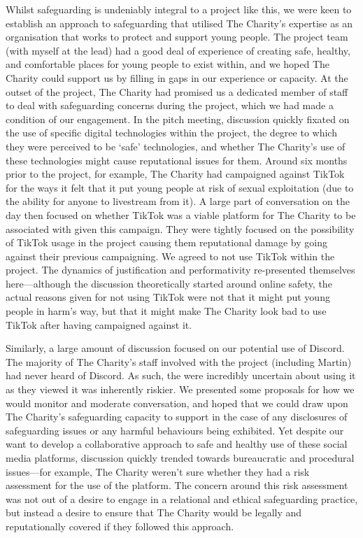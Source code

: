 Whilst safeguarding is undeniably integral to a project like this, we were keen to establish an approach to safeguarding that utilised The Charity's expertise as an organisation that works to protect and support young people. The project team (with myself at the lead) had a good deal of experience of creating safe, healthy, and comfortable places for young people to exist within, and we hoped The Charity could support us by filling in gaps in our experience or capacity.  At the outset of the project, The Charity had promised us a dedicated member of staff to deal with safeguarding concerns during the project, which we had made a condition of our engagement. In the pitch meeting, discussion quickly fixated on the use of specific digital technologies within the project, the degree to which they were perceived to be ‘safe’ technologies, and whether The Charity's use of these technologies might cause reputational issues for them. Around six months prior to the project, for example, The Charity had campaigned against TikTok for the ways it felt that it put young people at risk of sexual exploitation (due to the ability for anyone to livestream from it). A large part of conversation on the day then focused on whether TikTok was a viable platform for The Charity to be associated with given this campaign. They were tightly focused on the possibility of TikTok usage in the project causing them reputational damage by going against their previous campaigning. We agreed to not use TikTok within the project. The dynamics of justification and performativity re-presented themselves here—although the discussion theoretically started around online safety, the actual reasons given for not using TikTok were not that it might put young people in harm's way, but that it might make The Charity look bad to use TikTok after having campaigned against it. 

Similarly, a large amount of discussion focused on our potential use of Discord. The majority of The Charity's staff involved with the project (including Martin) had never heard of Discord. As such, the were incredibly uncertain about using it as they viewed it was inherently riskier. We presented some proposals for how we would monitor and moderate conversation, and hoped that we could draw upon The Charity's safeguarding capacity to support in the case of any disclosures of safeguarding issues or any harmful behaviours being exhibited. Yet despite our want to develop a collaborative approach to safe and healthy use of these social media platforms, discussion quickly trended towards bureaucratic and procedural issues—for example, The Charity weren't sure whether they had a risk assessment for the use of the platform. The concern around this risk assessment was not out of a desire to engage in a relational and ethical safeguarding practice, but instead a desire to ensure that The Charity would be legally and reputationally covered if they followed this approach.

